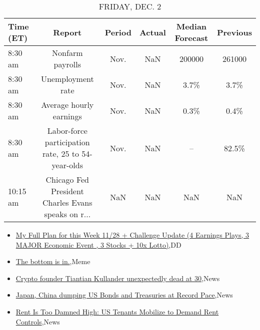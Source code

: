 \documentclass{article}%
\begin{document}
%


\begin{table}[htbp]%
\caption{FRIDAY, DEC. 2}%
\centering%
\begin{adjustbox}{width=1\textwidth}%
\begin{tabular}{lccccc}
\toprule
Time (ET) &                                             Report & Period & Actual & Median Forecast & Previous \\
\midrule
  8:30 am &                                   Nonfarm payrolls &   Nov. &    NaN &          200000 &   261000 \\
  8:30 am &                                  Unemployment rate &   Nov. &    NaN &            3.7\% &     3.7\% \\
  8:30 am &                            Average hourly earnings &   Nov. &    NaN &            0.3\% &     0.4\% \\
  8:30 am & Labor-force participation rate, 25 to 54-year-olds &   Nov. &    NaN &              -- &    82.5\% \\
 10:15 am & Chicago Fed President Charles Evans speaks on r... &    NaN &    NaN &             NaN &      NaN \\
\bottomrule
\end{tabular}
%
\end{adjustbox}%
\end{table}

%
\begin{itemize}%
\item%
\href{https://reddit.com/r/wallstreetbets/comments/z6uuhv/my\_full\_plan\_for\_this\_week\_1128\_challenge\_update/}{My Full Plan for this Week 11/28 + Challenge Update (4 Earnings Plays, 3 MAJOR Economic Event , 3 Stocks + 10x Lotto)},DD%
\item%
\href{https://reddit.com/r/wallstreetbets/comments/z6utvn/the\_bottom\_is\_in/}{The bottom is in.},Meme%
\item%
\href{https://reddit.com/r/StockMarket/comments/z6olcf/crypto\_founder\_tiantian\_kullander\_unexpectedly/}{Crypto founder Tiantian Kullander unexpectedly dead at 30},News%
\item%
\href{https://reddit.com/r/Economics/comments/z6q19q/japan\_china\_dumping\_us\_bonds\_and\_treasuries\_at/}{Japan, China dumping US Bonds and Treasuries at Record Pace},News%
\item%
\href{https://reddit.com/r/Economics/comments/z6pbpb/rent\_is\_too\_damned\_high\_us\_tenants\_mobilize\_to/}{Rent Is Too Damned High: US Tenants Mobilize to Demand Rent Controls},News%
\end{itemize}%
\end{document}
